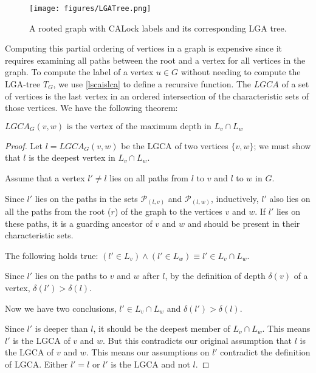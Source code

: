 \begin{figure}
	\centering
	\captionsetup{justification=centering}
	\texttt{[image: figures/LGATree.png]}
	\caption{A rooted graph with CALock labels and its corresponding LGA tree.} \label{fig:LGATree}
\end{figure}

Computing this partial ordering of vertices in a graph is expensive since it requires examining all paths between the root and a vertex for all vertices in the graph. To compute the label of a vertex $u \in G$ without needing to compute the LGA-tree $T_G$, we use \cref{lscaislca} to define a recursive function. 
The $LGCA$ of a set of vertices is the last vertex in an ordered intersection of the characteristic sets of those vertices. We have the following theorem:

\begin{theorem} \label{proofOfDeepness}
	$\mathit{LGCA}_G(v,w) \text{ is the vertex of the maximum depth in } L_v\cap L_w$
\end{theorem}

\begin{proof}
	 Let $l = LGCA_G(v,w)$ be the LGCA of two vertices $\{v, w\}$; we must show that $l$ is the deepest vertex in  $L_v \cap L_w$.

	Assume that a vertex $l' \neq l$ lies on all paths from $l$ to $v$ and $l$ to $w$ in $G$.

	Since $l'$ lies on the paths in the sets $\mathcal{P}_{(l,v)}$ and $\mathcal{P}_{(l,w)}$, inductively, $l'$ also lies on all the paths from the root ($r$) of the graph to the vertices $v$ and $w$.
	If  $l'$ lies on these paths, it is a guarding ancestor of $v$ and $w$ and should be present in their characteristic sets.
	
	The following holds true: $(l' \in L_v) \land (l' \in L_w) \equiv l' \in L_v \cap L_w$.

	Since $l'$ lies on the paths to $v$ and $w$ after $l$, by the definition of depth $\delta(v)$ of a vertex,	$\delta(l') > \delta(l)$.

	Now we have two conclusions, $l' \in L_v \cap L_w$ and $\delta(l') > \delta(l)$.

	Since $l'$ is deeper than $l$, it should be the deepest member of  $ L_v \cap L_w$.
	This means $l'$ is the LGCA of $v$ and $w$.
	But this contradicts our original assumption that $l$ is the LGCA of $v$ and $w$.
	This means our assumptions on $l'$ contradict the definition of LGCA. Either $l'=l$ or $l'$ is the LGCA and not $l$.
\end{proof}


